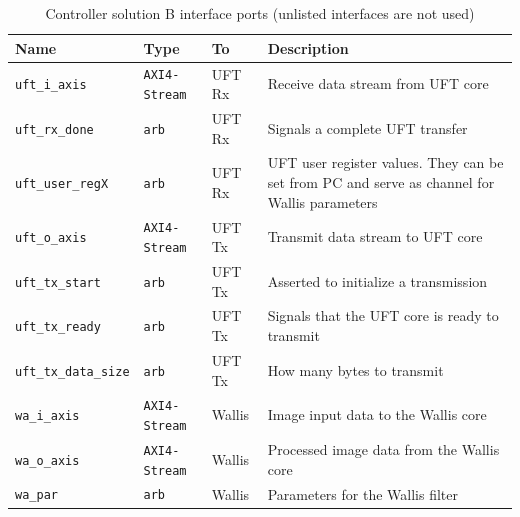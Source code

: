 \begin{table}[h!]
    \centering
    \begin{tabular}{l l l p{8cm}}
        \toprule
        Name & Type & To & Description \\
        \midrule
        \texttt{uft\_i\_axis} & \texttt{AXI4-Stream} & UFT Rx &
        Receive data stream from UFT core
        \\

        \texttt{uft\_rx\_done} & \texttt{arb} & UFT Rx &
        Signals a complete UFT transfer
        \\  
        \texttt{uft\_user\_regX} & \texttt{arb} & UFT Rx &
        UFT user register values. They can be set from PC and serve as channel
        for Wallis parameters
        \\  
        \midrule
        \texttt{uft\_o\_axis} & \texttt{AXI4-Stream} & UFT Tx &
        Transmit data stream to UFT core
        \\
        \texttt{uft\_tx\_start} & \texttt{arb} & UFT Tx &
        Asserted to initialize a transmission
        \\
        \texttt{uft\_tx\_ready} & \texttt{arb} & UFT Tx &
        Signals that the UFT core is ready to transmit
        \\
        \texttt{uft\_tx\_data\_size} & \texttt{arb} & UFT Tx &
        How many bytes to transmit
        \\
        \midrule
        \texttt{wa\_i\_axis} & \texttt{AXI4-Stream} & Wallis &
        Image input data to the Wallis core
        \\
        \texttt{wa\_o\_axis} & \texttt{AXI4-Stream} & Wallis &
        Processed image data from the Wallis core
        \\
        \texttt{wa\_par} & \texttt{arb} & Wallis &
        Parameters for the Wallis filter
        \\
        \bottomrule
    \end{tabular}
    \caption{Controller solution B interface ports (unlisted interfaces
    are not used)}
    \label{tab:controllerbports}
\end{table}

